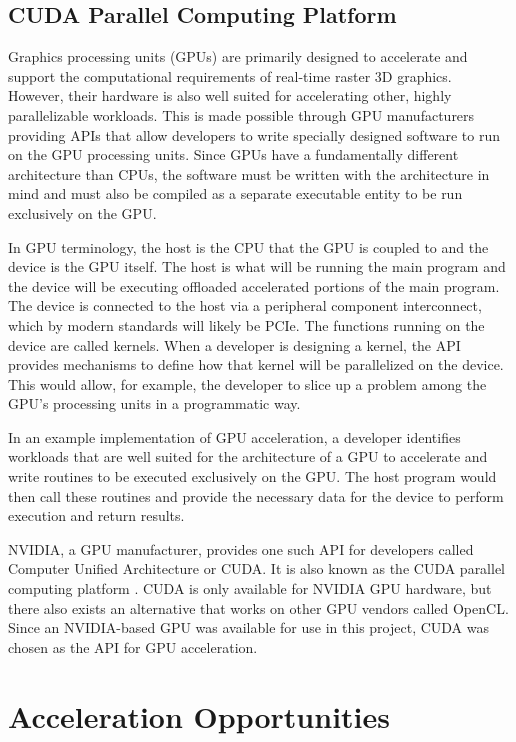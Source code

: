 \documentclass[conference, twoside]{IEEEtran}
\begin{document}
\subsection{CUDA Parallel Computing Platform}

Graphics processing units (GPUs) are primarily designed to accelerate and support the computational requirements of real-time raster 3D graphics. However, their hardware is also well suited for accelerating other, highly parallelizable workloads. This is made possible through GPU manufacturers providing APIs that allow developers to write specially designed software to run on the GPU processing units. Since GPUs have a fundamentally different architecture than CPUs, the software must be written with the architecture in mind and must also be compiled as a separate executable entity to be run exclusively on the GPU.

In GPU terminology, the host is the CPU that the GPU is coupled to and the device is the GPU itself. The host is what will be running the main program and the device will be executing offloaded accelerated portions of the main program. The device is connected to the host via a peripheral component interconnect, which by modern standards will likely be PCIe. The functions running on the device are called kernels. When a developer is designing a kernel, the API provides mechanisms to define how that kernel will be parallelized on the device. This would allow, for example, the developer to slice up a problem among the GPU's processing units in a programmatic way.

In an example implementation of GPU acceleration, a developer identifies workloads that are well suited for the architecture of a GPU to accelerate and write routines to be executed exclusively on the GPU. The host program would then call these routines and provide the necessary data for the device to perform execution and return results.

NVIDIA, a GPU manufacturer, provides one such API for developers called Computer Unified Architecture or CUDA. It is also known as the CUDA parallel computing platform \cite{nvidia-cuda}. CUDA is only available for NVIDIA GPU hardware, but there also exists an alternative that works on other GPU vendors called OpenCL. Since an NVIDIA-based GPU was available for use in this project, CUDA was chosen as the API for GPU acceleration.

\cite{electronic-structure-calculations-on-gpus}

\section{Acceleration Opportunities}
\end{document}
